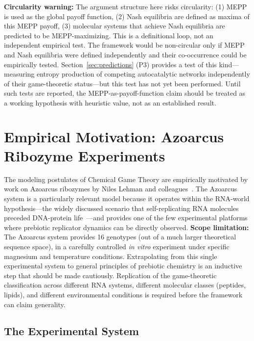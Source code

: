 \documentclass[12pt,a4paper]{article}
\theoremstyle{remark}
\begin{document}
\textbf{Circularity warning:} The argument structure here risks circularity: (1) MEPP is used as the global payoff function, (2) Nash equilibria are defined as maxima of this MEPP payoff, (3) molecular systems that achieve Nash equilibria are predicted to be MEPP-maximizing. This is a definitional loop, not an independent empirical test. The framework would be non-circular only if MEPP and Nash equilibria were defined independently and their co-occurrence could be empirically tested. Section~\ref{sec:predictions} (P3) provides a test of this kind---measuring entropy production of competing autocatalytic networks independently of their game-theoretic status---but this test has not yet been performed. Until such tests are reported, the MEPP-as-payoff-function claim should be treated as a working hypothesis with heuristic value, not as an established result.

\section{Empirical Motivation: Azoarcus Ribozyme Experiments}
\label{sec:azoarcus}

The modeling postulates of Chemical Game Theory are empirically motivated by work on Azoarcus ribozymes by Niles Lehman and colleagues~\citep{AzoarcusPNAS,AzoarcusPMC}. The Azoarcus system is a particularly relevant model because it operates within the RNA-world hypothesis---the widely discussed scenario that self-replicating RNA molecules preceded DNA-protein life~\citep{Gilbert1986,Eigen1979}---and provides one of the few experimental platforms where prebiotic replicator dynamics can be directly observed. \textbf{Scope limitation:} The Azoarcus system provides 16 genotypes (out of a much larger theoretical sequence space), in a carefully controlled \textit{in vitro} experiment under specific magnesium and temperature conditions. Extrapolating from this single experimental system to general principles of prebiotic chemistry is an inductive step that should be made cautiously. Replication of the game-theoretic classification across different RNA systems, different molecular classes (peptides, lipids), and different environmental conditions is required before the framework can claim generality.

\subsection{The Experimental System}
\end{document}
